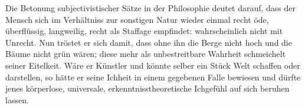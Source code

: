 Die Betonung subjectivistischer Sätze in der Philosophie deutet darauf, dass der Mensch sich im Verhältniss zur sonstigen Natur wieder einmal recht öde, überflüssig, langweilig, recht als Staffage empfindet: wahrscheinlich nicht mit Unrecht. Nun tröstet er sich damit, dass ohne ihn die Berge nicht hoch und die Bäume nicht grün wären; diese mehr als unbestreitbare Wahrheit schmeichelt seiner Eitelkeit. Wäre er Künstler und könnte selber ein Stück Welt schaffen oder darstellen, so hätte er seine Ichheit in einem gegebenen Falle bewiesen und dürfte jenes körperlose, universale, erkenntnisstheoretische Ichgefühl auf sich beruhen lassen.
\par

